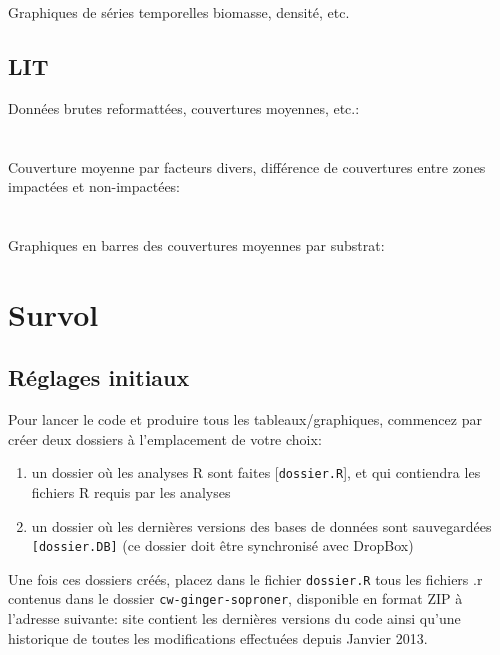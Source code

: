 \documentclass{article}
\begin{document}
\noindent Graphiques de séries temporelles biomasse, densité, etc.\\
\hyperlink{p5} {}

\subsection{LIT}
\noindent Données brutes reformattées, couvertures moyennes, etc.:\\
\hyperlink{l1} {}\\
\hyperlink{l2} {}\\

\noindent Couverture moyenne par facteurs divers, différence de
couvertures entre zones impactées et non-impactées:\\
\hyperlink{l3} {}\\
\hyperlink{l4} {}\\

\noindent Graphiques en barres des couvertures moyennes par substrat:\\
\hyperlink{l5} {}

\clearpage
\section{Survol}

\subsection*{Réglages initiaux}
\label{reglages1}
Pour lancer le code et produire tous les tableaux/graphiques,
commencez par créer deux dossiers à l'emplacement de votre choix:
\begin{enumerate}
      \item un dossier où les analyses R sont faites
      [\texttt{dossier.R}], et qui contiendra les fichiers R requis par
      les analyses
  \item un dossier où les dernières versions des bases de données sont
    sauvegardées \texttt{[dossier.DB]} (ce dossier doit être
    synchronisé avec DropBox)
     \end{enumerate}

     Une fois ces dossiers créés, placez dans le fichier
     \texttt{dossier.R} tous les fichiers .r contenus dans le dossier
     \texttt{cw-ginger-soproner}, disponible en format ZIP à l'adresse
     suivante:
     site contient les dernières versions du code ainsi qu'une
     historique de toutes les modifications effectuées depuis Janvier 2013.
\end{document}
